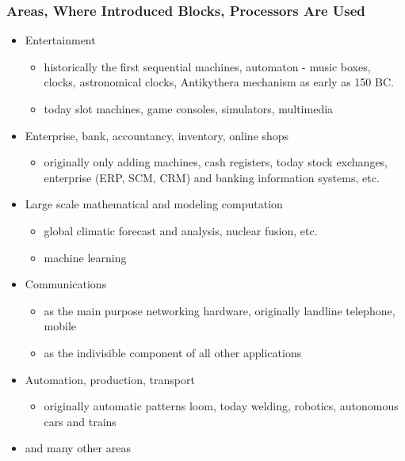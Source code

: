 \documentclass{beamer}
\begin{document}
\begin{frame}
\frametitle{Areas, Where Introduced Blocks, Processors Are Used}

\begin{itemize}
 \item Entertainment
 \begin{itemize}
  \item historically the first sequential machines, automaton - music boxes, clocks, astronomical clocks, Antikythera mechanism as early as 150 BC.
  \item today slot machines, game consoles, simulators, multimedia
 \end{itemize}
 \item Enterprise, bank, accountancy, inventory, online shops
 \begin{itemize}
  \item originally only adding machines, cash registers, today stock exchanges, enterprise (ERP, SCM, CRM) and banking information systems, etc.
 \end{itemize}
 \item Large scale mathematical and modeling computation
 \begin{itemize}
  \item global climatic forecast and analysis, nuclear fusion, etc.
  \item machine learning
 \end{itemize}
 \item Communications
 \begin{itemize}
  \item as the main purpose networking hardware, originally landline telephone, mobile
  \item as the indivisible component of all other applications
 \end{itemize}
 \item Automation, production, transport
 \begin{itemize}
  \item originally automatic patterns loom, today welding, robotics, autonomous cars and trains
 \end{itemize}
 \item and many other areas
\end{itemize}
\end{frame}
\end{document}
